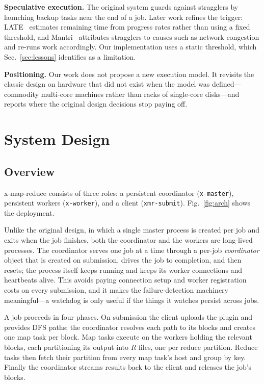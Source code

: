 \documentclass[conference]{IEEEtran}
\begin{document}
\textbf{Speculative execution.} The original system guards against stragglers
by launching backup tasks near the end of a job. Later work refines the
trigger: LATE~\cite{zaharia2008late} estimates remaining time from progress
rates rather than using a fixed threshold, and Mantri~\cite{ananthanarayanan2010mantri}
attributes stragglers to causes such as network congestion and re-runs work
accordingly. Our implementation uses a static threshold, which
Sec.~\ref{sec:lessons} identifies as a limitation.

\textbf{Positioning.} Our work does not propose a new execution model.
It revisits the classic design on hardware that did not exist when the model
was defined---commodity multi-core machines rather than racks of single-core
disks---and reports where the original design decisions stop paying off.

\section{System Design}
\label{sec:design}

\subsection{Overview}

x-map-reduce consists of three roles: a persistent coordinator
(\texttt{x-master}), persistent workers (\texttt{x-worker}), and a client
(\texttt{xmr-submit}). Fig.~\ref{fig:arch} shows the deployment.

Unlike the original design, in which a single master process is created per
job and exits when the job finishes, both the coordinator and the workers are
long-lived processes. The coordinator serves one job at a time through a
per-job \emph{coordinator} object that is created on submission, drives the
job to completion, and then resets; the process itself keeps running and
keeps its worker connections and heartbeats alive. This avoids paying
connection setup and worker registration costs on every submission, and it
makes the failure-detection machinery meaningful---a watchdog is only useful
if the things it watches persist across jobs.

A job proceeds in four phases. On submission the client uploads the plugin
and provides DFS paths; the coordinator resolves each path to its blocks and
creates one map task per block. Map tasks execute on the workers holding the
relevant blocks, each partitioning its output into $R$ files, one per reduce
partition. Reduce tasks then fetch their partition from every map task's host
and group by key. Finally the coordinator streams results back to the
client and releases the job's blocks.
\end{document}
